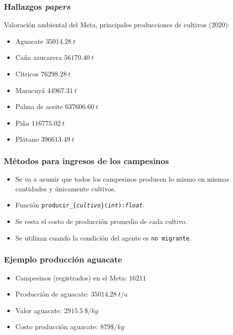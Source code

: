 \documentclass[17pt, t, lualatex]{beamer}
\begin{document}
\begin{frame}[allowframebreaks]
  \frametitle{Hallazgos \textit{papers}}
  
  Valoración ambiental del Meta\cite{EVA2020}, principales producciones de cultivos (2020):
  
  \begin{itemize}
    \item Aguacate $35014.28\ t$ 
    \item Caña azucarera $56170.40\ t$
    \item Cítricos $76298.28\ t$
    \item Maracuyá $44967.31\ t$
    \item Palma de aceite $637606.60\ t$
    \item Piña $116775.02\ t$
    \item Plátano $396613.49\ t$
  \end{itemize}


\end{frame}

\begin{frame}[allowframebreaks]
  \frametitle{Métodos para ingresos de los campesinos}
  

  \begin{itemize}
    \item Se va a asumir que todos los campesinos producen lo mismo en mismas cantidades y únicamente cultivos. 
    \item Función \texttt{producir\_\{\textit{cultivo}\}(\textit{int}):\textit{float}}.
    \item Se resta el costo de producción promedio de cada cultivo.
    \item Se utilizan cuando la condición del agente es \texttt{no migrante}.
  \end{itemize}


\end{frame}

\begin{frame}[allowframebreaks]
  \frametitle{Ejemplo producción aguacate}
  
  \begin{itemize}
    \item Campesinos (registrados) en el Meta: $16211$\cite{EVA2020}
    \item Producción de aguacate: $35014.28\ t/a$\cite{EVA2020}
    \item Valor aguacate: $2915.5\ \$/kg$\cite{CifrasSectoriales2021}
    \item Costo producción aguacate: $879 \$/kg$\cite{Finagro2022}
  \end{itemize}

\end{frame}
\end{document}
